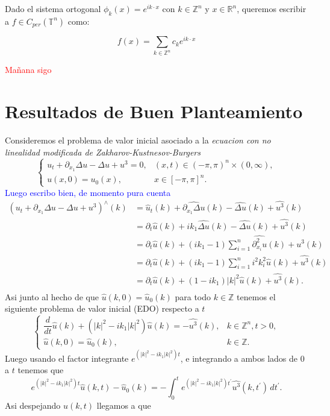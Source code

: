 \documentclass[12pt]{article}
\newcommand\R{\ensuremath{\mathbb{R}}}
\newcommand\Z{\ensuremath{\mathbb{Z}}}
\begin{document}
Dado el sistema ortogonal $\phi_k(x)=e^{ik\cdot x}$ con $k\in \Z^n$  y $x\in \R^n$, queremos escribir a $f\in C_{per}(\mathbb{T}^n)$ como:

$$f(x)=\sum_{k\in \Z^n}c_ke^{ik\cdot x}$$

\textcolor{red}{Mañana sigo}

\section{Resultados de Buen Planteamiento}

Consideremos el problema de valor inicial asociado a la \textit{ecuacion con no linealidad modificada de Zakharov-Kustnesov-Burgers}
$$\begin{cases}
    u_t+\partial_{x_1}\Delta u-\Delta u+u^3=0, & (x,t)\in(-\pi,\pi)^n\times(0,\infty),\\
    u(x,0)=u_0(x), & x\in[-\pi,\pi]^n.
\end{cases}$$
\textcolor{blue}{Luego escribo bien, de momento pura cuenta}
\begin{align*}
   (u_t+\partial_{x_1}\Delta u-\Delta u+u^3)^{\wedge}(k)&= \widehat{u}_t(k)+\widehat{\partial_{x_1}\Delta u}(k)-\widehat{\Delta u}(k)+\widehat{u^3}(k)\\
   &=\partial_t\widehat{u}(k)+ik_1\widehat{\Delta u}(k)-\widehat{\Delta u}(k)+\widehat{u^3}(k)\\
   &=\partial_t\widehat{u}(k)+(ik_1-1)\sum_{i=1}^n\widehat{\partial^2_{x_i}u}(k)+\widehat{u^3}(k)\\
   &=\partial_t\widehat{u}(k)+(ik_1-1)\sum_{i=1}^ni^2k_i^2\widehat{u}(k)+\widehat{u^3}(k)\\
   &=\partial_t\widehat{u}(k)+(1-ik_1)|k|^2\widehat{u}(k)+\widehat{u^3}(k).\\
\end{align*}
Asi junto al hecho de que $\widehat{u}(k,0)=\widehat{u}_0(k)$ para todo $k\in\Z$ tenemos el siguiente problema de valor inicial (EDO) respecto a $t$
$$\begin{cases}
    \dfrac{d}{dt}\widehat{u}(k)+(|k|^2-ik_1|k|^2)\widehat{u}(k)=-\widehat{u^3}(k), & k\in\Z^n,t>0,\\
    \widehat{u}(k,0)=\widehat{u}_0(k), &k\in\Z.
\end{cases}$$
Luego usando el factor integrante $e^{(|k|^2-ik_1|k|^2)t}$, e integrando a ambos lados de 0 a $t$ tenemos que
$$e^{(|k|^2-ik_1|k|^2)t}\widehat{u}(k,t)-\widehat{u}_0(k)=-\int_0^te^{(|k|^2-ik_1|k|^2)t^\prime}\widehat{u^3}(k,t^\prime)\,dt^\prime.$$
Asi despejando $\widehat{u}(k,t)$ llegamos a que
\end{document}
